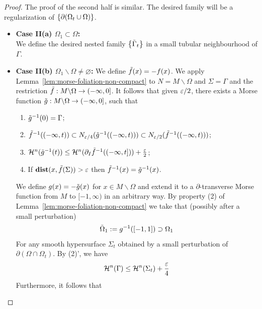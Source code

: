 \begin{lemma}
\begin{proof}
        The proof of the second half is similar. The desired family will be a regularization of $\left\{\partial(\Omega_t\cup \Omega)\right\}$.
        \begin{itemize}
            \item \textbf{Case II(a) $\Omega_1 \subset \Omega$:}\\
            We define the desired nested family $\left\{\Tilde{\Gamma}_t\right\}$ in a small tubular neighbourhood of $\Gamma$.
            \item \textbf{Case II(b) $\Omega_1\backslash\Omega \neq \varnothing$:}
            We define $\Tilde{f}(x) = -f(x)$. We apply Lemma~\ref{lem:morse-foliation-non-compact} to $N = M\backslash\Omega$ and $\Sigma = \Gamma$ and the restriction $\Tilde{f}: M\backslash\Omega \to (-\infty, 0]$. It follows that given $\varepsilon/2$, there exists a Morse function
            $\Tilde{g}: M\backslash\Omega \to (-\infty, 0]$, such that
            \begin{enumerate}
                \item $\Tilde{g}^{-1}(0) = \Gamma$;
                \item $\Tilde{f}^{-1}((-\infty, t)) \subset N_{\varepsilon/4}(\Tilde{g}^{-1}((-\infty, t))) \subset N_{\varepsilon/2}(\Tilde{f}^{-1}((-\infty, t)))$;
                \item $\mathcal{H}^n(\Tilde{g}^{-1}(t)) \leq \mathcal{H}^n(\partial_I\Tilde{f}^{-1}((-\infty, t])) + \frac{\varepsilon}{2}$;
                \item If $\mathbf{dist}(x, \Tilde{f}(\Sigma)) > \varepsilon$ then $\Tilde{f}^{-1}(x) = \Tilde{g}^{-1}(x)$.
            \end{enumerate}
            We define $g(x) = -\Tilde{g}(x)$ for $x \in M\backslash\Omega$ and extend it to a $\partial$-transverse Morse function from $M$ to $[-1, \infty)$ in an arbitrary way. By property (2) of Lemma~\ref{lem:morse-foliation-non-compact} we take that (possibly after a small perturbation)
            \begin{equation*}
               \Tilde{\Omega}_1 := g^{-1}([-1, 1]) \supset \Omega_1
            \end{equation*}
            For any smooth hypersurface $\Sigma_t$ obtained by a small perturbation of $\partial(\Omega\cap\Omega_t)$. By (2)', we have
            \begin{equation*}
                \mathcal{H}^n(\Gamma) \leq \mathcal{H}^n(\Sigma_t) + \frac{\varepsilon}{4}
            \end{equation*}
            Furthermore, it follows that
            \begin{equation*}

\end{equation*}
\end{itemize}
\end{proof}
\end{lemma}
